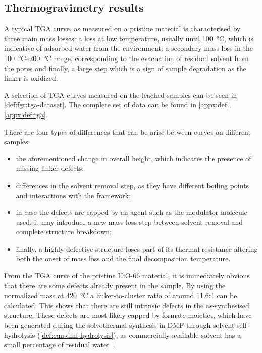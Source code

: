 
\subsection{Thermogravimetry results}

A typical TGA curve, as measured on a pristine material
is characterised by three main mass losses: a loss
at low temperature, usually until \SI{100}{\degreeCelsius},
which is indicative of adsorbed water from the environment;
a secondary mass loss in the \SIrange{100}{200}{\degreeCelsius}
range, corresponding to the evacuation of residual solvent 
from the pores and finally, a large step which is a sign of 
sample degradation as the linker is oxidized.

A selection of TGA curves measured on the leached samples
can be seen in \autoref{def:fgr:tga-dataset}. The complete set of data
can be found in \autoref{appx:def}, \autoref{appx:def:tga}.

There are four types of differences that can be arise 
between curves on different samples:

\begin{itemize}
    \item the aforementioned change in overall height,
    which indicates the presence of missing linker defects;
    \item differences in the solvent removal step, as they
    have different boiling points and interactions with the 
    framework;
    \item in case the defects are capped by an agent such as 
    the modulator molecule used, it may introduce a new 
    mass loss step between solvent removal and complete
    structure breakdown;
    \item finally, a highly defective structure loses part 
    of its thermal resistance altering both the onset of mass
    loss and the final decomposition temperature.
\end{itemize}

From the TGA curve of the pristine UiO-66 material, 
it is immediately obvious that there are some defects 
already present in the sample. By using the normalized
mass at \SI{420}{\degreeCelsius} a linker-to-cluster 
ratio of around 11.6:1 can be calculated. This shows that
there are still intrinsic defects in the as-synthesised 
structure. These defects are most likely capped by 
formate moieties, which have been generated during 
the solvothermal synthesis in DMF through solvent 
self-hydrolysis (\autoref{def:eqn:dmf-hydrolysis}), as 
commercially available solvent has a small percentage of 
residual water~\cite{shearerDefectEngineeringTuning2016}.


